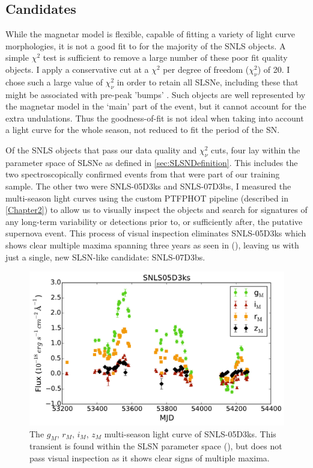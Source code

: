 \subsection{Candidates}
\label{sec:SLSNCands}
While the magnetar model is flexible, capable of fitting a variety of light curve morphologies, it is not a good fit to for the majority of the SNLS objects. A simple $\chi^2$ test is sufficient to remove a large number of these poor fit quality objects. I apply a conservative cut at a $\chi^2$ per degree of freedom ($\chi^2_{\nu}$) of 20. I chose such a large value of $\chi^2_{\nu}$ in order to retain all SLSNe, including these that might be associated with pre-peak 'bumps' \citep{Nicholl2015,Nicholl2015b,Smith2016}. Such objects are well represented by the magnetar model in the `main' part of the event, but it cannot account for the extra undulations. Thus the goodness-of-fit is not ideal when taking into account a light curve for the whole season, not reduced to fit the period of the SN.

Of the SNLS objects that pass our data quality and $\chi^2_{\nu}$ cuts, four lay within the parameter space of SLSNe as defined in \ref{sec:SLSNDefinition}. This includes the two spectroscopically confirmed events from \citet{Howell2013} that were part of our training sample. The other two were SNLS-05D3ks and SNLS-07D3bs, I  measured the multi-season light curves using the custom \textsc{PTFPHOT} pipeline (described in \cref{Chapter2}) to allow us to visually inspect the objects and search for signatures of any long-term variability or detections prior to, or sufficiently after, the putative supernova event. This process of visual inspection eliminates SNLS-05D3ks which shows clear multiple maxima spanning three years as seen in  (), leaving us with just a single, new SLSN-like candidate: SNLS-07D3bs.

\begin{figure}
\centering
\includegraphics[width=\textwidth]{Figures/Chapter4/SNLS05D3ks}
\caption{The $g_M$, $r_M$, $i_M$, $z_M$ multi-season light curve of SNLS-05D3ks. This transient is found within the SLSN parameter space (), but does not pass visual inspection as it shows clear signs of multiple maxima.}
\label{fig:05D3ks}
\end{figure}

